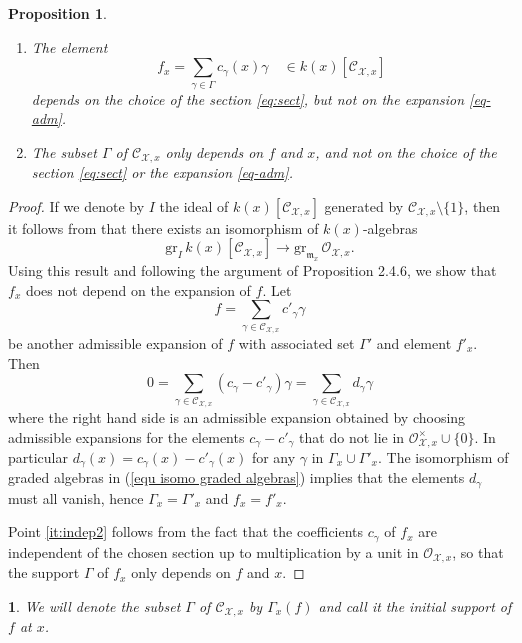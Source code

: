\documentclass{amsart}%
\numberwithin{equation}{subsection}
\theoremstyle{plain2}
\newtheorem{prop}[equation]{Proposition}
\theoremstyle{definition2}
\theoremstyle{stepstyle}
\theoremstyle{point}
\theoremstyle{subpoint}
\newtheorem{subpoint}[equation]{}%
\newcommand{\spa}[1]{\begin{subpoint}#1\end{subpoint}}           %
\newcommand{\cX}{\ensuremath{\mathscr{X}}}
\newcommand{\caO}{\ensuremath{\mathcal{O}}}
\begin{document}
\begin{prop}\label{prop-init}\item
\begin{enumerate}
\item \label{it:indep1} The element
$$f_x=\sum_{\gamma\in \Gamma}c_\gamma(x) \gamma\quad \in k(x)[\mathcal{C}_{\cX,x}]$$ depends on the choice of the section
\eqref{eq:sect}, but not on the expansion \eqref{eq-adm}. \item
\label{it:indep2} The subset $\Gamma$ of $\mathcal{C}_{\cX,x}$
only depends on $f$ and $x$, and not on the choice of the section
\eqref{eq:sect} or the expansion \eqref{eq-adm}.
\end{enumerate}
\end{prop}
\begin{proof}
If we denote by $I$ the ideal of $k(x)[\mathcal{C}_{\cX,x}]$ generated by $\mathcal{C}_{\cX,x}\setminus \{1\}$, then it follows from \cite{Kato1994a} that there exists an isomorphism of $k(x)$-algebras \begin{equation} \label{equ isomo graded algebras}
\mathrm{gr}_I \,k(x)[\mathcal{C}_{\cX,x}]\to \mathrm{gr}_{\mathfrak{m}_x}\, \mathcal{O}_{\cX,x}.
\end{equation}
Using this result and following the argument of  \cite{MustataNicaise} Proposition 2.4.6, we show that $f_x$ does not depend on the expansion of $f$. Let $$f=\sum_{\gamma \in \mathcal{C}_{\cX,x}}c'_{\gamma}\gamma$$ be another admissible expansion of $f$ with associated set $\Gamma'$ and element $f'_x$. Then $$0=\sum_{\gamma \in \mathcal{C}_{\cX,x}}(c_{\gamma}- c'_\gamma)\gamma =\sum_{\gamma \in \mathcal{C}_{\cX,x}}d_{\gamma}\gamma$$ where the right hand side is an admissible expansion obtained by choosing admissible expansions for the elements $c_\gamma-c'_\gamma$ that do not lie in $\caO_{\cX,x}^\times \cup \{0\}$. In particular $d_\gamma(x)= c_\gamma(x)-c'_\gamma(x)$ for any $\gamma$ in $ \Gamma_x \cup \Gamma'_x$. The isomorphism of graded algebras in (\ref{equ isomo graded algebras}) implies that the elements $d_\gamma$ must all vanish, hence $\Gamma_x = \Gamma'_x$ and $f_x=f'_x$.  

Point \eqref{it:indep2} follows from the fact that the coefficients $c_\gamma$ of $f_x$ are independent of the chosen section up to multiplication by a unit in $\mathcal{O}_{\cX,x}$, so that the support $\Gamma$ of $f_x$ only depends on $f$ and $x$.
\end{proof}

\spa{ We will denote the subset $\Gamma$ of $\mathcal{C}_{\cX,x}$
by $\Gamma_x(f)$ and call it the {\em initial support} of $f$ at
$x$.}
\end{document}
